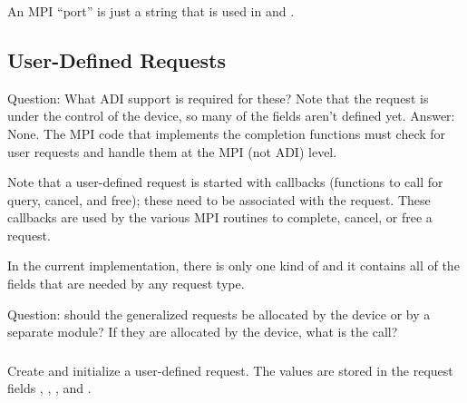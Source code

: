 \documentclass{article}
\begin{document}
\subsubsection{}
An MPI ``port'' is just a string that is used in  and
.  
%

\subsubsection{}


\subsection{User-Defined Requests}
\label{sec:grequest}

Question:  What ADI support is required for these?  Note that the
request is under the control of the device, so many of the fields
aren't defined yet.
Answer: None.  The MPI code that implements the completion functions
must check for user requests and handle them at the MPI (not ADI) level.

Note that a user-defined request is started with callbacks (functions
to call for query, cancel, and free); these need to be associated with
the request.  These callbacks are used by the various MPI routines to
complete, cancel, or free a request.

In the current implementation, there is only one kind of
 and it contains all of the fields that are needed
by any request type.  

Question: should the generalized requests be allocated by the device
or by a separate module?  If they are allocated by the device, what is
the call?

\subsubsection{}
Create and initialize a user-defined request.  The values are stored
in the request fields ,
,
, and
. 
\end{document}
